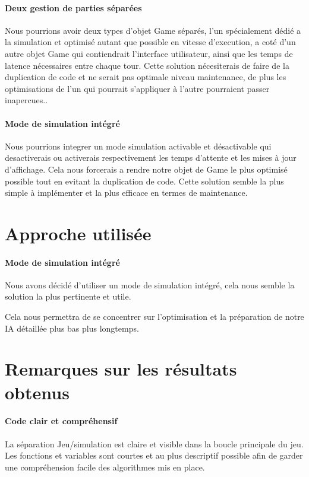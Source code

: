\documentclass{scrreprt}
\begin{document}
    \paragraph{Deux gestion de parties séparées}
    Nous pourrions avoir deux types d'objet Game séparés, l'un
    spécialement dédié a la simulation et optimisé autant que possible en
    vitesse d'execution, a coté d'un autre objet Game qui contiendrait
    l'interface utilisateur, ainsi que les temps de latence nécessaires entre
    chaque tour.
    Cette solution nécesiterais de faire de la duplication de
    code et ne serait pas optimale niveau maintenance, de plus les
    optimisations de l'un qui pourrait s'appliquer à l'autre pourraient
    passer inapercues..

    \paragraph{Mode de simulation intégré}
    Nous pourrions integrer un mode simulation activable et désactivable qui
    desactiverais ou activerais respectivement les temps d'attente et les
    mises à jour d'affichage.
    Cela nous forcerais a rendre notre objet de Game le plus optimisé
    possible tout en evitant la duplication de code.
    Cette solution semble la plus simple à implémenter et la plus efficace en
    termes de maintenance.

    \section{Approche utilisée}


    \paragraph{Mode de simulation intégré}
    Nous avons décidé d'utiliser un mode de simulation intégré, cela nous
    semble la solution la plus pertinente et utile.

    \begin{result}
        Cela nous permettra de se concentrer sur l'optimisation et la préparation
        de notre IA détaillée plus bas plus longtemps.
    \end{result}


    \section{Remarques sur les résultats obtenus}

    \paragraph{Code clair et compréhensif}
    La séparation Jeu/simulation est claire et visible dans la boucle
    principale du jeu.
    Les fonctions et variables sont courtes et au plus descriptif possible
    afin de garder une compréhension facile des algorithmes mis en place.
\end{document}
